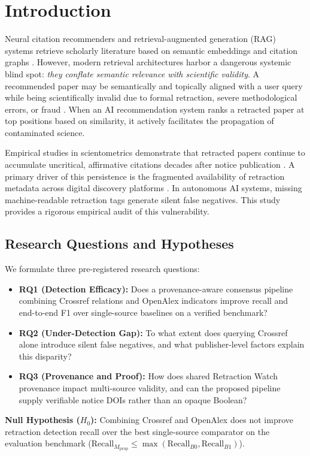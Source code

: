 \documentclass[10pt,a4paper,twocolumn]{article}
\begin{document}
\section{Introduction}
Neural citation recommenders and retrieval-augmented generation (RAG) systems retrieve scholarly literature based on semantic embeddings and citation graphs \cite{jatowt2023mining, cohan2019structural}. However, modern retrieval architectures harbor a dangerous systemic blind spot: \emph{they conflate semantic relevance with scientific validity}. A recommended paper may be semantically and topically aligned with a user query while being scientifically invalid due to formal retraction, severe methodological errors, or fraud \cite{brainard2018rethinking}. When an AI recommendation system ranks a retracted paper at top positions based on similarity, it actively facilitates the propagation of contaminated science.

Empirical studies in scientometrics demonstrate that retracted papers continue to accumulate uncritical, affirmative citations decades after notice publication \cite{heibi2021qualitative}. A primary driver of this persistence is the fragmented availability of retraction metadata across digital discovery platforms \cite{frampton2021inconsistent}. In autonomous AI systems, missing machine-readable retraction tags generate silent false negatives. This study provides a rigorous empirical audit of this vulnerability.

\subsection{Research Questions and Hypotheses}
We formulate three pre-registered research questions:
\begin{itemize}
    \item \textbf{RQ1 (Detection Efficacy):} Does a provenance-aware consensus pipeline combining Crossref relations and OpenAlex indicators improve recall and end-to-end F1 over single-source baselines on a verified benchmark?
    \item \textbf{RQ2 (Under-Detection Gap):} To what extent does querying Crossref alone introduce silent false negatives, and what publisher-level factors explain this disparity?
    \item \textbf{RQ3 (Provenance and Proof):} How does shared Retraction Watch provenance impact multi-source validity, and can the proposed pipeline supply verifiable notice DOIs rather than an opaque Boolean?
\end{itemize}
\textbf{Null Hypothesis ($H_0$):} Combining Crossref and OpenAlex does not improve retraction detection recall over the best single-source comparator on the evaluation benchmark ($\text{Recall}_{M_{\text{prop}}} \le \max(\text{Recall}_{B0}, \text{Recall}_{B1})$).
\end{document}
